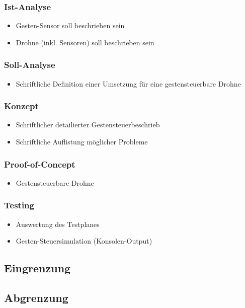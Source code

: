 \subsubsection{Ist-Analyse}
\begin{itemize}
	\item Gesten-Sensor soll beschrieben sein
	\item Drohne (inkl. Sensoren) soll beschrieben sein
\end{itemize}

\subsubsection{Soll-Analyse}
\begin{itemize}
	\item Schriftliche Definition einer Umsetzung für eine gestensteuerbare Drohne
\end{itemize}

\subsubsection{Konzept}
\begin{itemize}
	\item Schriftlicher detailierter Gestensteuerbeschrieb
	\item Schriftliche Auflistung möglicher Probleme
\end{itemize}

\subsubsection{Proof-of-Concept}
\begin{itemize}
	\item Gestensteuerbare Drohne
\end{itemize}

\subsubsection{Testing}
\begin{itemize}
	\item Auswertung des Testplanes
	\item Gesten-Steuersimulation (Konsolen-Output)
\end{itemize}


\subsection{Eingrenzung}

\subsection{Abgrenzung}

